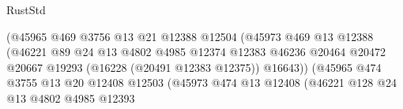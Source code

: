 \begin{lexlean}{RustStd}
\begin{coremodule}
                                                (@45965
                                                  @469
                                                  @3756
                                                  @13
                                                  @21
                                                  @12388
                                                  @12504
                                                  (@45973
                                                    @469
                                                    @13
                                                    @12388
                                                    (@46221
                                                      @89
                                                      @24
                                                      @13
                                                      @4802
                                                      @4985
                                                      @12374
                                                      @12383
                                                      @46236
                                                      @20464
                                                      @20472
                                                      @20667
                                                      @19293
                                                      (@16228 (@20491 @12383 @12375))
                                                      @16643))
                                                  (@45965
                                                    @474
                                                    @3755
                                                    @13
                                                    @20
                                                    @12408
                                                    @12503
                                                    (@45973
                                                      @474
                                                      @13
                                                      @12408
                                                      (@46221
                                                        @128
                                                        @24
                                                        @13
                                                        @4802
                                                        @4985
                                                        @12393

\end{coremodule}
\end{lexlean}
